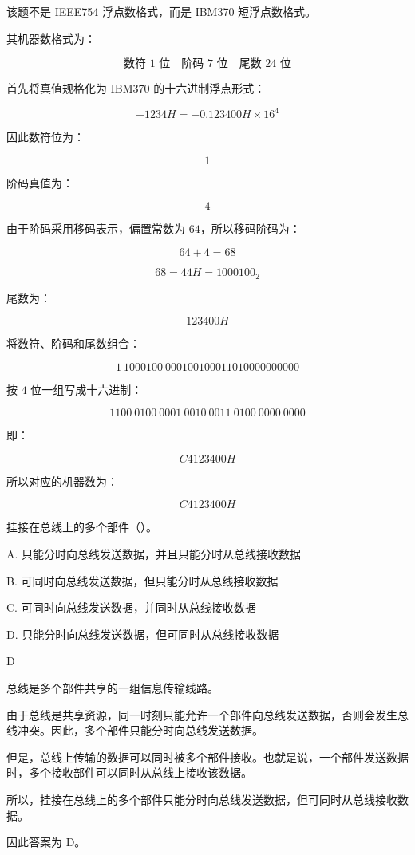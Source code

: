 \begin{analysisenv}
该题不是 IEEE754 浮点数格式，而是 IBM370 短浮点数格式。

其机器数格式为：

\[
\text{数符 }1\text{ 位}
\quad
\text{阶码 }7\text{ 位}
\quad
\text{尾数 }24\text{ 位}
\]

首先将真值规格化为 IBM370 的十六进制浮点形式：

\[
-1234H=-0.123400H \times 16^4
\]

因此数符位为：

\[
1
\]

阶码真值为：

\[
4
\]

由于阶码采用移码表示，偏置常数为 $64$，所以移码阶码为：

\[
64+4=68
\]

\[
68=44H=1000100_2
\]

尾数为：

\[
123400H
\]

将数符、阶码和尾数组合：

\[
1\ 1000100\ 000100100011010000000000
\]

按 $4$ 位一组写成十六进制：

\[
1100\ 0100\ 0001\ 0010\ 0011\ 0100\ 0000\ 0000
\]

即：

\[
C4123400H
\]

所以对应的机器数为：

\[
C4123400H
\]
\end{analysisenv}







\begin{question}
挂接在总线上的多个部件（）。

A. 只能分时向总线发送数据，并且只能分时从总线接收数据

B. 可同时向总线发送数据，但只能分时从总线接收数据

C. 可同时向总线发送数据，并同时从总线接收数据

D. 只能分时向总线发送数据，但可同时从总线接收数据
\end{question}

\begin{answer}
D
\end{answer}

\begin{analysisenv}
总线是多个部件共享的一组信息传输线路。

由于总线是共享资源，同一时刻只能允许一个部件向总线发送数据，否则会发生总线冲突。因此，多个部件只能分时向总线发送数据。

但是，总线上传输的数据可以同时被多个部件接收。也就是说，一个部件发送数据时，多个接收部件可以同时从总线上接收该数据。

所以，挂接在总线上的多个部件只能分时向总线发送数据，但可同时从总线接收数据。

因此答案为 D。
\end{analysisenv}


